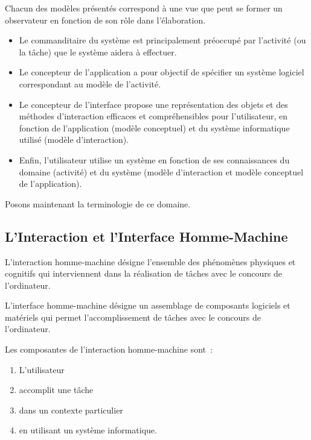 \documentclass[
]{book}
\providecommand{\tightlist}{%
  \setlength{\itemsep}{0pt}\setlength{\parskip}{0pt}}
\begin{document}
Chacun des modèles présentés correspond à une vue que peut se former un
observateur en fonction de son rôle dans l'élaboration.

\begin{itemize}
\tightlist
\item
  Le commanditaire du système est principalement
  préoccupé par l'activité (ou la tâche) que le système aidera à
  effectuer.
\item
  Le concepteur de l'application a pour objectif de
  spécifier un système logiciel correspondant au modèle de l'activité.
\item
  Le concepteur de l'interface propose une
  représentation des objets et des méthodes d'interaction efficaces et
  compréhensibles pour l'utilisateur, en fonction de l'application (modèle
  conceptuel) et du système informatique utilisé (modèle d'interaction).
\item
  Enfin, l'utilisateur utilise un système en fonction
  de ses connaissances du domaine (activité) et du système (modèle
  d'interaction et modèle conceptuel de l'application).
\end{itemize}

Posons maintenant la terminologie de ce domaine.

\hypertarget{linteraction-et-linterface-homme-machine}{%
\subsection{L'Interaction et l'Interface Homme-Machine}\label{linteraction-et-linterface-homme-machine}}

L'interaction homme-machine désigne l'ensemble des phénomènes physiques et
cognitifs qui interviennent dans la réalisation de tâches avec le concours de
l'ordinateur.

L'interface homme-machine désigne un assemblage de composants logiciels et
matériels qui permet l'accomplissement de tâches avec le concours de
l'ordinateur.

Les composantes de l'interaction homme-machine sont~:

\begin{enumerate}
\def\labelenumi{\arabic{enumi}.}
\tightlist
\item
  L'utilisateur
\item
  accomplit une tâche
\item
  dans un contexte particulier
\item
  en utilisant un système informatique.
\end{enumerate}
\end{document}
